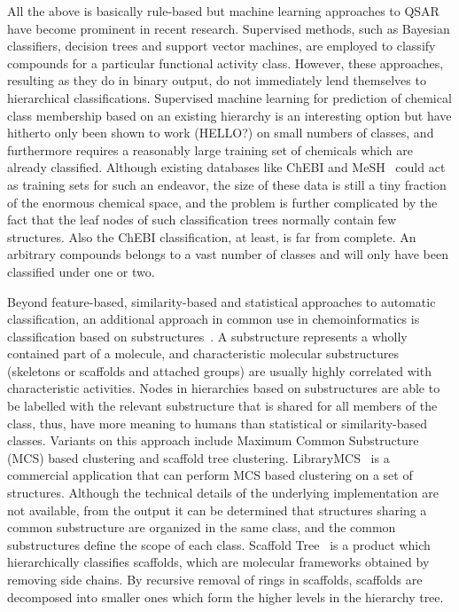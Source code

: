 \documentclass[10pt]{bmc_article}
\newenvironment{bmcformat}{\baselineskip20pt\sloppy\setboolean{publ}{false}}{\baselineskip20pt\sloppy}
\begin{document}
\begin{bmcformat}
All the above is basically rule-based but machine learning approaches to QSAR have become prominent in recent research. Supervised methods, such as Bayesian classifiers, decision trees and support vector machines, are employed to classify compounds for a particular functional activity class.  However, these approaches, resulting as they do in binary output, do not immediately lend themselves to hierarchical classifications.  Supervised machine learning for prediction of chemical class membership based on an existing hierarchy is an interesting option but have hitherto only been shown to work (HELLO?) on small numbers of classes, and furthermore requires a reasonably large training set of chemicals which are already classified.  Although existing databases like ChEBI and MeSH~\cite{meshUrl} could act as training sets for such an endeavor, the size of these data is still a tiny fraction of the enormous chemical space, and the problem is further complicated by the fact that the leaf nodes of such classification trees normally contain few structures. Also the ChEBI classification, at least, is far from complete. An arbitrary compounds belongs to a vast number of classes and will only have been classified under one or two. 


Beyond feature-based, similarity-based and statistical approaches to automatic classification, an additional approach in common use in chemoinformatics is classification based on substructures~\cite{deshpande2005}.  A substructure represents a wholly contained part of a molecule, and characteristic molecular substructures (skeletons or scaffolds and attached groups) are usually highly correlated with characteristic activities.  Nodes in hierarchies based on substructures are able to be labelled with the relevant substructure that is shared for all members of the class, thus, have more meaning to humans than statistical or similarity-based classes. Variants on this approach include Maximum Common Substructure (MCS) based clustering and scaffold tree clustering. LibraryMCS~\cite{librarymcs} is a commercial application that can perform MCS based clustering on a set of structures. Although the technical details of the underlying implementation are not available, from the output it can be determined that structures sharing a common substructure are organized in the same class, and the common substructures define the scope of each class.  Scaffold Tree~\cite{Schuffenhauer2007} is a product which hierarchically classifies scaffolds, which are molecular frameworks obtained by removing side chains.  By recursive removal of rings in scaffolds, scaffolds are decomposed into smaller ones which form the higher levels in the hierarchy tree.  


\end{bmcformat}
\end{document}
